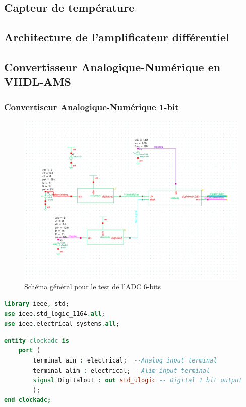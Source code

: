 \documentclass[a4paper]{article}
\begin{document}
\subsection{Capteur de temp\'erature}
\subsection{Architecture de l'amplificateur diff\'erentiel}

\clearpage
\subsection{Convertisseur Analogique-Num\'erique en VHDL-AMS}

\subsubsection{Convertiseur Analogique-Num\'erique 1-bit}

\begin{figure}[!htb]
\begin{center}
  \includegraphics[scale=0.60]{Architecture-ADC-test.png}
  \caption{Sch\'ema g\'en\'eral pour le test de l'ADC 6-bits }
\end{center}
\end{figure}

\begin{lstlisting}[language=VHDL, belowskip=-0.5 \baselineskip]
library ieee, std;
use ieee.std_logic_1164.all;
use ieee.electrical_systems.all;
\end{lstlisting}

\begin{lstlisting}[language=VHDL, belowskip=-0.5 \baselineskip]
entity clockadc is
	port (
		terminal ain : electrical;  --Analog input terminal
		terminal alim : electrical; --Alim input terminal
		signal Digitalout : out std_ulogic -- Digital 1 bit output
		);
end clockadc;
\end{lstlisting}
\end{document}
